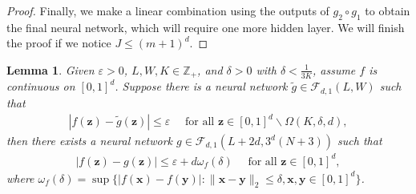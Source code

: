 \documentclass[11pt, preprint]{imsart}
\numberwithin{equation}{section}
\def \mcF{\mathcal{F}}
\def \bfx{\mathbf{x}}
\def \bfx{\mathbf{x}}
\def \bfz{\mathbf{z}}
\def \bfy{\mathbf{y}}
\theoremstyle{plain}
\newtheorem{lemma}{\indent Lemma}
\theoremstyle{definition}
\begin{document}
\begin{proof}
Finally, we make a linear combination using the outputs of $g_2\circ g_1$ to obtain the final neural network, which will require one more hidden layer. We will finish the proof  if we notice $J\leq (m+1)^d$.
\end{proof}

\begin{lemma}\label{lemma:continuous:extension:approximation}
Given $\varepsilon>0$, $L, W, K\in \mathbb{Z}_+$, and $\delta>0$ with $\delta<\frac{1}{3K}$, assume $f$ is continuous on $[0, 1]^d$. Suppose there is a neural network $\widetilde{g}\in \mcF_{d,1}(L, W)$ such that
\begin{eqnarray}
	|f(\bfz)-\widetilde{g}(\bfz)|\leq \varepsilon \quad \textrm{ for all } \bfz\in [0,1]^d\backslash \Omega(K, \delta, d),\nonumber
\end{eqnarray}
then there exists a neural network $g\in \mcF_{d,1}(L+2d, 3^d(N+3))$ such that
\begin{eqnarray}
	|f(\bfz)-g(\bfz)|\leq \varepsilon+d\omega_f(\delta) \quad \textrm{ for all } \bfz\in [0,1]^d,\nonumber
\end{eqnarray}
where $\omega_f(\delta)=\sup\{|f(\bfx)-f(\bfy)|: \|\bfx-\bfy\|_2\leq \delta, \bfx, \bfy\in [0, 1]^d\}$.
\end{lemma}
\end{document}
